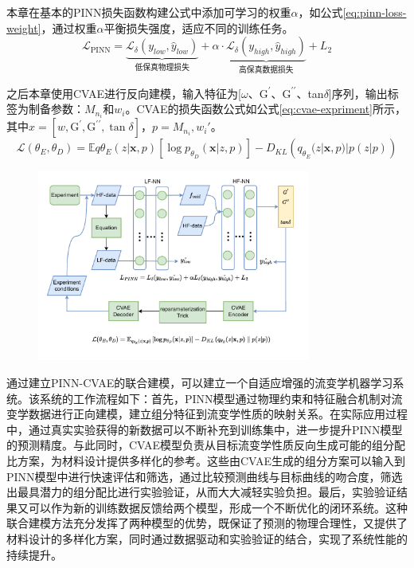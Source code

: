 本章在基本的PINN损失函数构建公式中添加可学习的权重$\alpha$，如公式\eqref{eq:pinn-loss-weight}，通过权重$\alpha$平衡损失强度，适应不同的训练任务。
\begin{equation}
  \mathcal{L}_{\text{PINN}} = \underbrace{\mathcal{L}_\delta(y_{low}, \hat{y}_{low})}_{\text{低保真物理损失}} + \alpha \cdot \underbrace{\mathcal{L}_\delta(y_{high}, \hat{y}_{high})}_{\text{高保真数据损失}}+L_{2}  \label{eq:pinn-loss-weight}
\end{equation}


之后本章使用CVAE进行反向建模，输入特征为[$\omega$、$\mathrm{G^{\prime}}$、$\mathrm{G^{\prime\prime}}$、tan$\delta$]序列，输出标签为制备参数：$M_{n_i}$和$w_i$。CVAE的损失函数公式如公式\eqref{eq:cvae-expriment}所示，其中$x = [w, \mathrm{G^{\prime}}, \mathrm{G^{\prime\prime}}, \tan \delta]$，$p = { M_{n_i}, w_i }'$。
\begin{equation}
  \mathcal{L}(\theta_E, \theta_D) = \mathbb{E}{q{\theta_E}(z|\mathbf{x},p)} \left[ \log p_{\theta_D}(\mathbf{x}|z,p) \right] - D_{KL}\left(q_{\theta_E}(z|\mathbf{x},p) | p(z|p)\right) \label{eq:cvae-expriment}
\end{equation}
\begin{figure}[htbp]
  \centering
  \includegraphics[width=0.8\textwidth]{Fig/PINN-CVAE.pdf}
\end{figure}

通过建立PINN-CVAE的联合建模，可以建立一个自适应增强的流变学机器学习系统。该系统的工作流程如下：首先，PINN模型通过物理约束和特征融合机制对流变学数据进行正向建模，建立组分特征到流变学性质的映射关系。在实际应用过程中，通过真实实验获得的新数据可以不断补充到训练集中，进一步提升PINN模型的预测精度。与此同时，CVAE模型负责从目标流变学性质反向生成可能的组分配比方案，为材料设计提供多样化的参考。这些由CVAE生成的组分方案可以输入到PINN模型中进行快速评估和筛选，通过比较预测曲线与目标曲线的吻合度，筛选出最具潜力的组分配比进行实验验证，从而大大减轻实验负担。最后，实验验证结果又可以作为新的训练数据反馈给两个模型，形成一个不断优化的闭环系统。这种联合建模方法充分发挥了两种模型的优势，既保证了预测的物理合理性，又提供了材料设计的多样化方案，同时通过数据驱动和实验验证的结合，实现了系统性能的持续提升。

